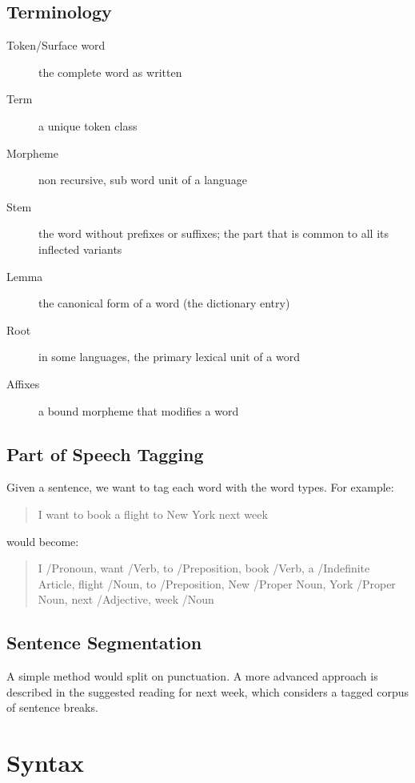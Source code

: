 \documentclass{idc_msc}
\begin{document}
\subsection{Terminology}

\begin{description}
  \item[Token/Surface word] the complete word as written
  \item[Term] a unique token class
  \item[Morpheme] non recursive, sub word unit of a language
  \item[Stem] the word without prefixes or suffixes; the part that is common to all its inflected variants
  \item[Lemma] the canonical form of a word (the dictionary entry)
  \item[Root] in some languages, the primary lexical unit of a word
  \item[Affixes] a bound morpheme that modifies a word
\end{description}

\subsection{Part of Speech Tagging}

Given a sentence, we want to tag each word with the word types.
For example:

\begin{quote}
I want to book a flight to New York next week
\end{quote}

would become:

\begin{quote}
I /Pronoun, want /Verb, to /Preposition, book /Verb, a /Indefinite Article, flight /Noun, to /Preposition, New /Proper Noun, York /Proper Noun, next /Adjective, week /Noun
\end{quote}

\subsection{Sentence Segmentation}

A simple method would split on punctuation.
A more advanced approach is described in the suggested reading for next week, which considers a tagged corpus of sentence breaks.

\section{Syntax}
\end{document}
